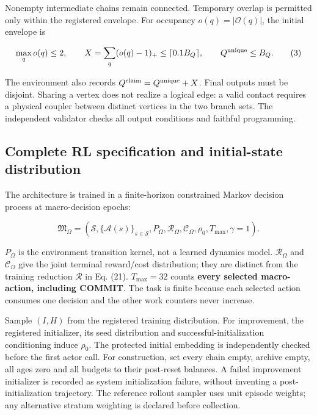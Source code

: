 \documentclass[10pt,a4paper]{article}
\begin{document}
Nonempty intermediate chains remain connected. Temporary overlap is
permitted only within the registered envelope. For occupancy
\(o(q)=|\mathcal O(q)|\), the initial envelope is

\[
\max_q o(q)\le2,\qquad
X=\sum_q(o(q)-1)_+\le\lceil0.1B_Q\rceil,
\qquad Q^{\rm unique}\le B_Q.
\tag{3}
\]

The environment also records \(Q^{\rm claim}=Q^{\rm unique}+X\). Final
outputs must be disjoint. Sharing a vertex does not realize a logical
edge: a valid contact requires a physical coupler between distinct
vertices in the two branch sets. The independent validator checks all
output conditions and faithful programming.

\hypertarget{complete-rl-specification-and-initial-state-distribution}{%
\subsection{Complete RL specification and initial-state
distribution}\label{complete-rl-specification-and-initial-state-distribution}}

The architecture is trained in a finite-horizon constrained Markov
decision process at macro-decision epochs:

\[
\mathfrak M_\Omega=(\mathcal S,\{\mathcal A(s)\}_{s\in\mathcal S},P_\Omega,
\mathcal R_\Omega,\mathcal C_\Omega,\rho_0,T_{\max},\gamma=1).
\tag{3a}
\]

\(P_\Omega\) is the environment transition kernel, not a learned
dynamics model. \(\mathcal R_\Omega\) and \(\mathcal C_\Omega\) give the
joint terminal reward/cost distribution; they are distinct from the
training reduction \(\mathcal R\) in Eq. (21). \(T_{\max}=32\) counts
\textbf{every selected macro-action, including COMMIT}. The task is
finite because each selected action consumes one decision and the other
work counters never increase.

Sample \((I,H)\) from the registered training distribution. For
improvement, the registered initializer, its seed distribution and
successful-initialization conditioning induce \(\rho_0\). The protected
initial embedding is independently checked before the first actor call.
For construction, set every chain empty, archive empty, all ages zero
and all budgets to their post-reset balances. A failed improvement
initializer is recorded as system initialization failure, without
inventing a post-initialization trajectory. The reference rollout
sampler uses unit episode weights; any alternative stratum weighting is
declared before collection.
\end{document}
